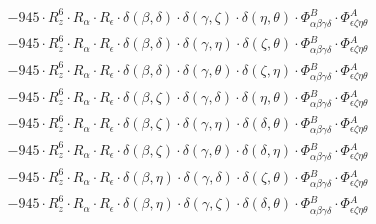 \documentclass{article}
\begin{document}
\begin{equation}
\begin{array}{c}
 \\[0.2em] 		 - 945 \cdot R_{z}^{6} \cdot R_{\alpha{}} \cdot R_{\epsilon{}} \cdot \delta{}\left(\beta{}, \delta{}\right) \cdot \delta{}\left(\gamma{}, \zeta{}\right) \cdot \delta{}\left(\eta{}, \theta{}\right) \cdot \Phi{}^{B}_{\alpha{}\beta{}\gamma{}\delta{}} \cdot \Phi{}^{A}_{\epsilon{}\zeta{}\eta{}\theta{}} 
 \\[0.2em] 		 - 945 \cdot R_{z}^{6} \cdot R_{\alpha{}} \cdot R_{\epsilon{}} \cdot \delta{}\left(\beta{}, \delta{}\right) \cdot \delta{}\left(\gamma{}, \eta{}\right) \cdot \delta{}\left(\zeta{}, \theta{}\right) \cdot \Phi{}^{B}_{\alpha{}\beta{}\gamma{}\delta{}} \cdot \Phi{}^{A}_{\epsilon{}\zeta{}\eta{}\theta{}} 
 \\[0.2em] 		 - 945 \cdot R_{z}^{6} \cdot R_{\alpha{}} \cdot R_{\epsilon{}} \cdot \delta{}\left(\beta{}, \delta{}\right) \cdot \delta{}\left(\gamma{}, \theta{}\right) \cdot \delta{}\left(\zeta{}, \eta{}\right) \cdot \Phi{}^{B}_{\alpha{}\beta{}\gamma{}\delta{}} \cdot \Phi{}^{A}_{\epsilon{}\zeta{}\eta{}\theta{}} 
 \\[0.2em] 		 - 945 \cdot R_{z}^{6} \cdot R_{\alpha{}} \cdot R_{\epsilon{}} \cdot \delta{}\left(\beta{}, \zeta{}\right) \cdot \delta{}\left(\gamma{}, \delta{}\right) \cdot \delta{}\left(\eta{}, \theta{}\right) \cdot \Phi{}^{B}_{\alpha{}\beta{}\gamma{}\delta{}} \cdot \Phi{}^{A}_{\epsilon{}\zeta{}\eta{}\theta{}} 
 \\[0.2em] 		 - 945 \cdot R_{z}^{6} \cdot R_{\alpha{}} \cdot R_{\epsilon{}} \cdot \delta{}\left(\beta{}, \zeta{}\right) \cdot \delta{}\left(\gamma{}, \eta{}\right) \cdot \delta{}\left(\delta{}, \theta{}\right) \cdot \Phi{}^{B}_{\alpha{}\beta{}\gamma{}\delta{}} \cdot \Phi{}^{A}_{\epsilon{}\zeta{}\eta{}\theta{}} 
 \\[0.2em] 		 - 945 \cdot R_{z}^{6} \cdot R_{\alpha{}} \cdot R_{\epsilon{}} \cdot \delta{}\left(\beta{}, \zeta{}\right) \cdot \delta{}\left(\gamma{}, \theta{}\right) \cdot \delta{}\left(\delta{}, \eta{}\right) \cdot \Phi{}^{B}_{\alpha{}\beta{}\gamma{}\delta{}} \cdot \Phi{}^{A}_{\epsilon{}\zeta{}\eta{}\theta{}} 
 \\[0.2em] 		 - 945 \cdot R_{z}^{6} \cdot R_{\alpha{}} \cdot R_{\epsilon{}} \cdot \delta{}\left(\beta{}, \eta{}\right) \cdot \delta{}\left(\gamma{}, \delta{}\right) \cdot \delta{}\left(\zeta{}, \theta{}\right) \cdot \Phi{}^{B}_{\alpha{}\beta{}\gamma{}\delta{}} \cdot \Phi{}^{A}_{\epsilon{}\zeta{}\eta{}\theta{}} 
 \\[0.2em] 		 - 945 \cdot R_{z}^{6} \cdot R_{\alpha{}} \cdot R_{\epsilon{}} \cdot \delta{}\left(\beta{}, \eta{}\right) \cdot \delta{}\left(\gamma{}, \zeta{}\right) \cdot \delta{}\left(\delta{}, \theta{}\right) \cdot \Phi{}^{B}_{\alpha{}\beta{}\gamma{}\delta{}} \cdot \Phi{}^{A}_{\epsilon{}\zeta{}\eta{}\theta{}} 

\end{array}
\end{equation}
\end{document}

